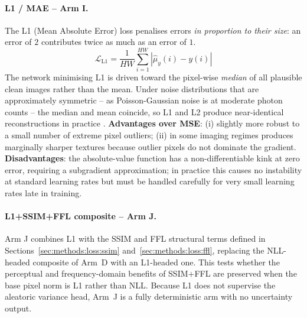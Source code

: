 \documentclass[12pt, a4paper, twoside, openright]{book}
\begin{document}
\paragraph{L1 / MAE -- Arm I.}
The L1 (Mean Absolute Error) loss penalises errors \emph{in proportion to their size}: an error of $2$ contributes twice as much as an error of $1$.
\begin{equation}
\label{eq:methods:mae}
\mathcal{L}_{\mathrm{L1}} = \frac{1}{HW}\sum_{i=1}^{HW}\left|\hat{\mu}_y(i) - y(i)\right|
\end{equation}
The network minimising L1 is driven toward the pixel-wise \emph{median} of all plausible clean images rather than the mean. Under noise distributions that are approximately symmetric -- as Poisson-Gaussian noise is at moderate photon counts -- the median and mean coincide, so L1 and L2 produce near-identical reconstructions in practice \cite{zhao_loss_2017}. \textbf{Advantages over MSE}: (i) slightly more robust to a small number of extreme pixel outliers; (ii) in some imaging regimes produces marginally sharper textures because outlier pixels do not dominate the gradient. \textbf{Disadvantages}: the absolute-value function has a non-differentiable kink at zero error, requiring a subgradient approximation; in practice this causes no instability at standard learning rates but must be handled carefully for very small learning rates late in training.

\paragraph{L1+SSIM+FFL composite -- Arm J.}
Arm J combines L1 with the SSIM and FFL structural terms defined in Sections~\ref{sec:methods:loss:ssim} and~\ref{sec:methods:loss:ffl}, replacing the NLL-headed composite of Arm~D with an L1-headed one. This tests whether the perceptual and frequency-domain benefits of SSIM+FFL are preserved when the base pixel norm is L1 rather than NLL. Because L1 does not supervise the aleatoric variance head, Arm~J is a fully deterministic arm with no uncertainty output.
\end{document}
